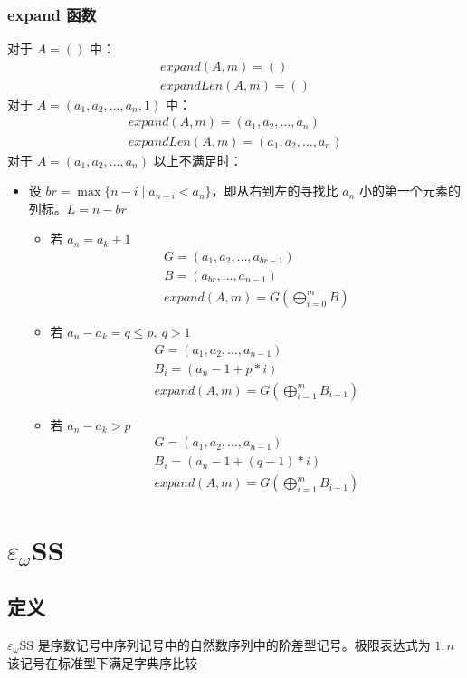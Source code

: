 \documentclass[UTF8]{ctexart}
\begin{document}
\subsubsection{expand 函数}
对于 $A=()$ 中：
\begin{gather*}
expand(A,m)=()\\
expandLen(A,m)=()
\end{gather*}
对于 $A=(a_1,a_2,\dots,a_n,1)$ 中：
\begin{gather*}
expand(A,m)=(a_1,a_2,\dots,a_n)\\
expandLen(A,m)=(a_1,a_2,\dots,a_n)
\end{gather*}
对于 $A=(a_1,a_2,\dots,a_n)$ 以上不满足时：
\begin{itemize}
  \item 设 $br=\max\{n-i\mid a_{n-i}<a_n\}$，即从右到左的寻找比 $a_n$ 小的第一个元素的列标。$L=n-br$
  \begin{itemize}
    \item 若 $a_n=a_k+1$
    \begin{gather*}
    G=(a_1,a_2,\dots,a_{br-1})\\
    B=(a_{br},\dots,a_{n-1})\\
    expand(A,m)=G(\bigoplus^m_{i=0}B)
    \end{gather*}
    \item 若 $a_n-a_k=q\le p,\ q>1$
    \begin{gather*}
    G=(a_1,a_2,\dots,a_{n-1})\\
    B_i=(a_n-1+p*i)\\
    expand(A,m)=G(\bigoplus^m_{i=1}B_{i-1})
    \end{gather*}
    \item 若 $a_n-a_k>p$
    \begin{gather*}
    G=(a_1,a_2,\dots,a_{n-1})\\
    B_i=(a_n-1+(q-1)*i)\\
    expand(A,m)=G(\bigoplus^m_{i=1}B_{i-1})
    \end{gather*}
  \end{itemize}
\end{itemize}

\section{$\varepsilon_\omega$SS}
\subsection{定义}
$\varepsilon_\omega$SS 是序数记号中序列记号中的自然数序列中的阶差型记号。极限表达式为 $1,n$
该记号在标准型下满足字典序比较
\end{document}

